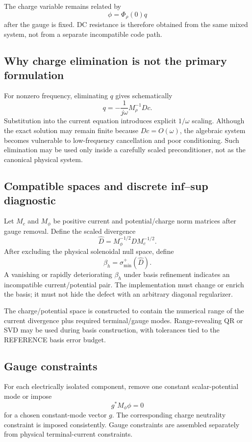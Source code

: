 The charge variable remains related by
\[
  \phi=\Phi_\rho(0)q
\]
after the gauge is fixed. DC resistance is therefore obtained from the same
mixed system, not from a separate incompatible code path.

\subsection{Why charge elimination is not the primary formulation}

For nonzero frequency, eliminating $q$ gives schematically
\[
  q=-\frac{1}{j\omega}M_\rho^{-1}Dc.
\]
Substitution into the current equation introduces explicit $1/\omega$ scaling.
Although the exact solution may remain finite because $Dc=O(\omega)$, the
algebraic system becomes vulnerable to low-frequency cancellation and poor
conditioning. Such elimination may be used only inside a carefully scaled
preconditioner, not as the canonical physical system.

\subsection{Compatible spaces and discrete inf--sup diagnostic}

Let $M_c$ and $M_\phi$ be positive current and potential/charge norm matrices
after gauge removal. Define the scaled divergence
\[
  \widehat D
  =
  M_\phi^{-1/2}DM_c^{-1/2}.
\]
After excluding the physical solenoidal null space, define
\[
  \beta_h
  =
  \sigma_{\min}^{+}(\widehat D).
\]
A vanishing or rapidly deteriorating $\beta_h$ under basis refinement indicates
an incompatible current/potential pair. The implementation must change or
enrich the basis; it must not hide the defect with an arbitrary diagonal
regularizer.

The charge/potential space is constructed to contain the numerical range of the
current divergence plus required terminal/gauge modes. Range-revealing QR or
SVD may be used during basis construction, with tolerances tied to the
REFERENCE basis error budget.

\subsection{Gauge constraints}

For each electrically isolated component, remove one constant scalar-potential
mode or impose
\[
  g^\ast M_\phi\phi=0
\]
for a chosen constant-mode vector $g$. The corresponding charge neutrality
constraint is imposed consistently. Gauge constraints are assembled separately
from physical terminal-current constraints.

